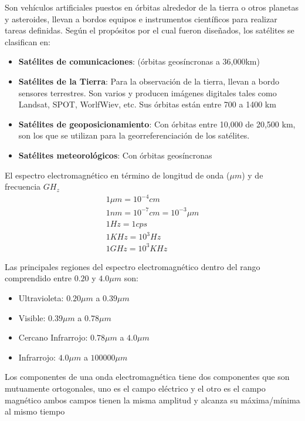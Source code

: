 \begin{definition}[Satelites]
    Son vehículos artificiales puestos en órbitas alrededor de la tierra o otros planetas y asteroides, llevan a bordos equipos e instrumentos científicos para realizar tareas definidas. 
    Según el propósitos por el cual fueron diseñados, los satélites se clasifican en: 
    \begin{itemize}
        \item \textbf{Satélites de comunicaciones}: (órbitas geosíncronas a 36,000km)
        \item \textbf{Satélites de la Tierra}: Para la observación de la tierra, llevan a bordo sensores terrestres. Son varios y producen imágenes digitales tales como Landsat, SPOT, WorlfWiev, etc. Sus órbitas están entre 700 a 1400 km 
        \item \textbf{Satélites de geoposicionamiento}: Con órbitas entre 10,000 de 20,500 km, son los que se utilizan para la georreferenciación de los satélites.
        \item \textbf{Satélites meteorológicos}: Con órbitas geosíncronas 
    \end{itemize}
\end{definition}

El espectro electromagnético en término de longitud de onda ($\mu m$) y de frecuencia $GH_z$
\begin{align*}
    1\mu m=10^{-4}cm\\ 
    1nm=10^{-7}cm=10^{-3}\mu m\\ 
    1Hz=1cps\\ 
    1KHz=10^3Hz\\ 
    1GHz=10^{3}KHz
\end{align*}

Las principales regiones del espectro electromagnético dentro del rango comprendido entre $0.20$ y $4.0\mu m$ son: 
\begin{itemize}
    \item Ultravioleta: $0.20\mu m$ a $0.39\mu m$
    \item Visible: $0.39\mu m$ a $0.78\mu m$
    \item Cercano Infrarrojo: $0.78\mu m$ a $4.0\mu m$
    \item Infrarrojo: $4.0\mu m$ a $100000\mu m$
\end{itemize}

Los componentes de una onda electromagnética tiene dos componentes que son mutuamente ortogonales, uno es el campo eléctrico y el otro es el campo magnético
ambos campos tienen la misma amplitud y alcanza su máxima/mínima al mismo tiempo

